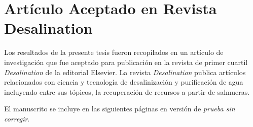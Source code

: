 \chapter{Artículo Aceptado en Revista Desalination}\label{sec:article}
Los resultados de la presente tesis fueron recopilados en un artículo de investigación que fue aceptado para publicación en la revista de primer cuartil \textit{Desalination} de la editorial Elsevier. La revista \textit{Desalination} publica artículos relacionados con ciencia y tecnología de desalinización y purificación de agua incluyendo entre sus tópicos, la recuperación de recursos a partir de salmueras.

El manuscrito se incluye en las siguientes páginas en versión de \textit{prueba sin corregir}.
